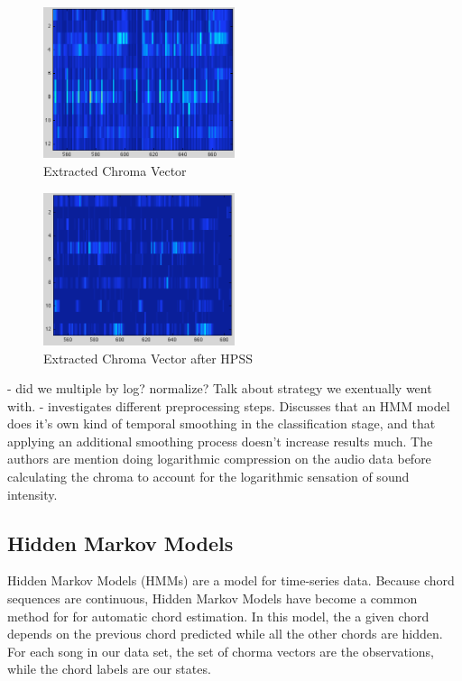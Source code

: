 \documentclass{article}
\begin{document}
\begin{figure}
	\centering
	\includegraphics[width=0.5\textwidth]{187.png}
	\caption{Extracted Chroma Vector}
	\label{fig:ChromaNorm}
\end{figure}

\begin{figure}
	\centering
	\includegraphics[width=0.5\textwidth]{187h.png}
	\caption{Extracted Chroma Vector after HPSS}
	\label{fig:ChromaHPSS}
\end{figure}

- did we multiple by log? normalize? Talk about strategy we exentually went with.
- \cite{Jiang:22} investigates different preprocessing steps. Discusses that
an HMM model does it's own kind of temporal smoothing in the classification
stage, and that applying an additional smoothing process doesn't increase results much.
The authors are mention doing logarithmic compression on the audio data before
calculating the chroma to account for the logarithmic sensation of sound intensity.

\subsection{Hidden Markov Models}

Hidden Markov Models (HMMs) are a model for time-series data. Because chord sequences are continuous,  Hidden Markov Models have become a common method for for automatic chord estimation. In this model, the a given chord depends on the previous chord predicted while all the other chords are hidden. For each song in our data set, the set of chorma vectors are the observations, while the chord labels are our states. 
\end{document}
